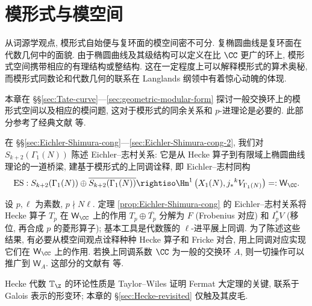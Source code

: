 
\chapter{模形式与模空间}
从词源学观点, 模形式自始便与复环面的模空间密不可分. 复椭圆曲线是复环面在代数几何中的面貌. 由于椭圆曲线及其级结构可以定义在比 $\CC$ 更广的环上, 模形式空间携带相应的有理结构或整结构. 这在一定程度上可以解释模形式的算术奥秘, 而模形式同数论和代数几何的联系在 Langlands 纲领中有着惊心动魄的体现.

本章在 \S\S\ref{sec:Tate-curve}---\ref{sec:geometric-modular-form} 探讨一般交换环上的模形式空间以及相应的模问题, 这对于模形式的同余关系和 $p$-进理论是必要的. 此部分参考了经典文献 \cite{DR73, Ka73} 等.

在 \S\S\ref{sec:Eichler-Shimura-cong}---\ref{sec:Eichler-Shimura-cong-2}, 我们对 $S_{k+2}(\Gamma_1(N))$ 陈述 Eichler--志村关系: 它是从 Hecke 算子到有限域上椭圆曲线理论的一道桥梁, 建基于模形式的上同调诠释, 即 Eichler--志村同构
\[ \text{ES}: S_{k+2}(\Gamma_1(N)) \oplus \overline{S_{k+2}(\Gamma_1(N))} \rightiso \Hm^1\left( X_1(N), j_* {}^k V_{\Gamma_1(N)} \right) =: \mathsf{W}_{\CC}. \]

设 $p, \ell$ 为素数, $p \nmid N\ell$. 定理 \ref{prop:Eichler-Shimura-cong} 的 Eichler--志村关系将 Hecke 算子 $T_p$ 在 $\mathsf{W}_{\CC}$ 上的作用 $T_p \oplus \overline{T_p}$ 分解为 $F$ (Frobenius 对应) 和 $I_p^* V$ (移位, 再合成 $p$ 的菱形算子); 基本工具是代数簇的 $\ell$-进平展上同调. 为了陈述这些结果, 有必要从模空间观点诠释种种 Hecke 算子和 Fricke 对合, 用上同调对应实现它们在 $\mathsf{W}_{\CC}$ 上的作用. 若换上同调系数 $\CC$ 为一般的交换环 $A$, 则一切操作可以推广到 $\mathsf{W}_A$. 这部分的文献有 \cite{Del71, Shi71, DI95} 等.

Hecke 代数 $\HkT_{\Z}$ 的环论性质是 Taylor--Wiles \cite{TW95} 证明 Fermat 大定理的关键, 联系于 Galois 表示的形变环; 本章的 \S\ref{sec:Hecke-revisited} 仅触及其皮毛.

